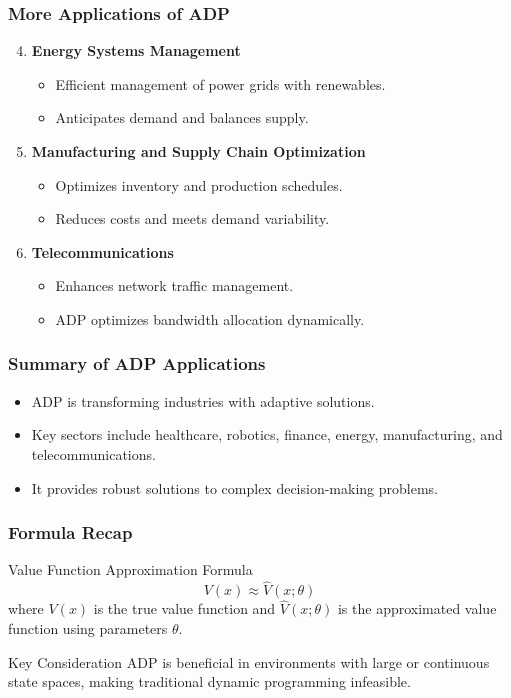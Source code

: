 \documentclass[aspectratio=169]{beamer}
\begin{document}
\begin{frame}[fragile]
    \frametitle{More Applications of ADP}
    \begin{enumerate}
        \setcounter{enumi}{3}
        \item \textbf{Energy Systems Management}
            \begin{itemize}
                \item Efficient management of power grids with renewables.
                \item Anticipates demand and balances supply.
            \end{itemize}
        \item \textbf{Manufacturing and Supply Chain Optimization}
            \begin{itemize}
                \item Optimizes inventory and production schedules.
                \item Reduces costs and meets demand variability.
            \end{itemize}
        \item \textbf{Telecommunications}
            \begin{itemize}
                \item Enhances network traffic management.
                \item ADP optimizes bandwidth allocation dynamically.
            \end{itemize}
    \end{enumerate}
\end{frame}

\begin{frame}[fragile]
    \frametitle{Summary of ADP Applications}
    \begin{itemize}
        \item ADP is transforming industries with adaptive solutions.
        \item Key sectors include healthcare, robotics, finance, energy, manufacturing, and telecommunications.
        \item It provides robust solutions to complex decision-making problems.
    \end{itemize}
\end{frame}

\begin{frame}[fragile]
    \frametitle{Formula Recap}
    \begin{block}{Value Function Approximation Formula}
        \begin{equation}
            V(x) \approx \hat{V}(x; \theta)
        \end{equation}
        where \( V(x) \) is the true value function and \( \hat{V}(x; \theta) \) is the approximated value function using parameters \( \theta \).
    \end{block}
    
    \begin{block}{Key Consideration}
        ADP is beneficial in environments with large or continuous state spaces, making traditional dynamic programming infeasible.
    \end{block}
\end{frame}
\end{document}
